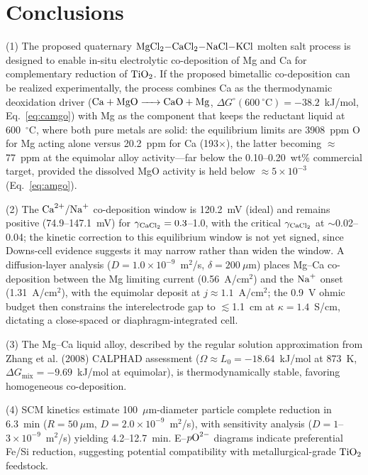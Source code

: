 \documentclass[11pt]{article}
\begin{document}
\section*{Conclusions}

(1) The proposed quaternary $\ce{MgCl2-CaCl2-NaCl-KCl}$ molten salt process is designed to enable in-situ electrolytic co-deposition of Mg and Ca for complementary reduction of $\ce{TiO2}$. If the proposed bimetallic co-deposition can be realized experimentally, the process combines Ca as the thermodynamic deoxidation driver ($\ce{Ca + MgO -> CaO + Mg}$, $\Delta G^{\circ}(600~^{\circ}\mathrm{C}) = -38.2$~kJ/mol, Eq.~\ref{eq:camgo}) with Mg as the component that keeps the reductant liquid at 600~$^{\circ}$C, where both pure metals are solid: the equilibrium limits are 3908~ppm O for Mg acting alone versus 20.2~ppm for Ca (193$\times$), the latter becoming $\approx$77~ppm at the equimolar alloy activity---far below the 0.10--0.20~wt\% commercial target, provided the dissolved MgO activity is held below $\approx 5\times10^{-3}$ (Eq.~\ref{eq:amgo}).

(2) The $\ce{Ca^{2+}/Na+}$ co-deposition window is 120.2~mV (ideal) and remains positive (74.9--147.1~mV) for $\gamma_{\ce{CaCl2}} = 0.3$--1.0, with the critical $\gamma_{\ce{CaCl2}}$ at $\sim$0.02--0.04; the kinetic correction to this equilibrium window is not yet signed, since Downs-cell evidence suggests it may narrow rather than widen the window. A diffusion-layer analysis ($D = 1.0\times10^{-9}$~m$^2$/s, $\delta = 200~\mu$m) places Mg--Ca co-deposition between the Mg limiting current (0.56~A/cm$^2$) and the $\ce{Na+}$ onset (1.31~A/cm$^2$), with the equimolar deposit at $j \approx 1.1$~A/cm$^2$; the 0.9~V ohmic budget then constrains the interelectrode gap to $\lesssim$1.1~cm at $\kappa = 1.4$~S/cm, dictating a close-spaced or diaphragm-integrated cell.

(3) The Mg--Ca liquid alloy, described by the regular solution approximation from Zhang et al. (2008) CALPHAD assessment ($\Omega \approx L_0 = -18.64$~kJ/mol at 873~K, $\Delta G_{\mathrm{mix}} = -9.69$~kJ/mol at equimolar), is thermodynamically stable, favoring homogeneous co-deposition.

(4) SCM kinetics estimate 100~$\mu$m-diameter particle complete reduction in 6.3~min ($R = 50~\mu$m, $D = 2.0\times10^{-9}$~m$^2$/s), with sensitivity analysis ($D = 1$--$3\times10^{-9}$~m$^2$/s) yielding 4.2--12.7~min. E--$p\ce{O^{2-}}$ diagrams indicate preferential Fe/Si reduction, suggesting potential compatibility with metallurgical-grade $\ce{TiO2}$ feedstock.
\end{document}
